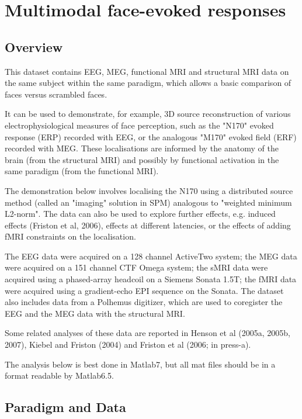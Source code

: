 
\chapter{Multimodal face-evoked responses}


\section{Overview}

This dataset contains EEG, MEG, functional MRI and structural MRI data on the same subject within the same paradigm, which allows a basic comparison of faces versus scrambled faces.

It can be used to demonstrate, for example, 3D source reconstruction of various electrophysiological measures of face perception, such as the "N170" evoked response (ERP) recorded with EEG, or the analogous "M170" evoked field (ERF) recorded with MEG. These localisations are informed by the anatomy of the brain (from the structural MRI) and possibly by functional activation in the same paradigm (from the functional MRI).

The demonstration below involves localising the N170 using a distributed source method (called an "imaging" solution in SPM) analogous to "weighted minimum L2-norm". The data can also be used to explore further effects, e.g. induced effects (Friston et al, 2006), effects at different latencies, or the effects of adding fMRI constraints on the localisation.

The EEG data were acquired on a 128 channel ActiveTwo system; the MEG data were acquired on a 151 channel CTF Omega system; the sMRI data were acquired using a phased-array headcoil on a Siemens Sonata 1.5T; the fMRI data were acquired using a gradient-echo EPI sequence on the Sonata. The dataset also includes data from a Polhemus digitizer, which are used to coregister the EEG and the MEG data with the structural MRI.

Some related analyses of these data are reported in Henson et al (2005a, 2005b, 2007), Kiebel and Friston (2004) and Friston et al (2006; in press-a).

The analysis below is best done in Matlab7, but all mat files should be in a format readable by Matlab6.5.

\section{Paradigm and Data}

